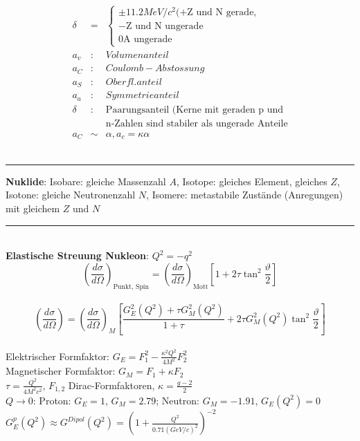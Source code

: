 \documentclass[10pt,twoside,a4paper]{article}
\begin{document}
\begin{multicols*}{3}
\begin{eqnarray*}
\delta &=& \begin{cases}
\pm 11.2 MeV/c^2 (+ \text{Z und N gerade},\\
 - \text{Z und N ungerade}\\
0 \text{A ungerade}
\end{cases}\\[-3pt]
a_v &:& Volumenanteil\\[-5pt]
a_C &:& Coulomb-Abstossung\\[-5pt]
a_S &:&Oberfl.anteil\\[-5pt]
a_a &:&Symmetrieanteil\\[-5pt]
\delta &:&\text{Paarungsanteil (Kerne mit geraden p und }\\[-5pt]~&~&\text{n-Zahlen sind stabiler als ungerade Anteile}\\[-4pt]
a_C &\sim& \alpha, a_c = \kappa \alpha 
\end{eqnarray*}\vspace{-8pt}
\\ \rule[0ex]{\columnwidth}{0.5pt}
\textbf{Nuklide}: Isobare: gleiche Massenzahl $A$, Isotope: gleiches Element, gleiches $Z$, Isotone: gleiche Neutronenzahl $N$, Isomere: metastabile Zustände (Anregungen) mit gleichem $Z$ und $N$
\\ \rule[0ex]{\columnwidth}{0.5pt}
\ \\
\textbf{Elastische Streuung Nukleon}: $Q^2 = -q^2$ \\
$$\left(\frac{d\sigma}{d\Omega}\right)_{\text{Punkt, Spin}} = \left(\frac{d\sigma}{d\Omega}\right)_{\text{Mott}} \left[ 1 + 2 \tau \tan^2 \frac{\vartheta}{2} \right]$$ \\[-5pt]
$$\scriptscriptstyle{\left(\frac{d\sigma}{d\Omega}\right) = \left(\frac{d\sigma}{d\Omega}\right)_{M} \left[ \frac{G^2_E(Q^2) + \tau G^2_M(Q^2)}{1 + \tau} + 2 \tau G^2_M(Q^2) \tan^2 \frac{\vartheta}{2} \right]}$$ \\[-10pt]
Elektrischer Formfaktor: $G_E = F^2_1 - \frac{\kappa^2 Q^2}{4 M^2} F^2_2$ \\
Magnetischer Formfaktor: $G_M = F_1 + \kappa F_2$ \\
$\tau = \frac{Q^2}{4M^2 c^2}$, $F_{1,2}$ Dirac-Formfaktoren, $\kappa = \frac{g-2}{2}$ \\
$Q \to 0$: Proton: $G_E=1$, $G_M=2.79$; Neutron: $G_M=-1.91$, $G_E(Q^2)=0$ \\
$G^p_E(Q^2) \approx G^{Dipol}(Q^2) = \left(1 + \frac{Q^2}{0.71 (GeV/c)^2}\right)^{-2}$

\end{multicols*}
\end{document}
